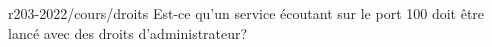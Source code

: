 \begin{question}{r203-2022/cours/droits}
  Est-ce qu'un service écoutant sur le port 100 doit être lancé avec
  des droits d'administrateur?
  \begin{reponses}
  \end{reponses}
\end{question}

